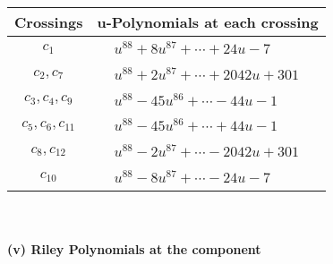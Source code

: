 \documentclass[1p]{elsarticle_modified}
\theoremstyle{definition}
\begin{document}
\begin{tabular}{m{50pt}|m{274pt}}
Crossings & \hspace{64pt}u-Polynomials at each crossing \\
\hline $$\begin{aligned}c_{1}\end{aligned}$$&$\begin{aligned}
&u^{88}+8 u^{87}+\cdots+24 u-7
\end{aligned}$\\
\hline $$\begin{aligned}c_{2},c_{7}\end{aligned}$$&$\begin{aligned}
&u^{88}+2 u^{87}+\cdots+2042 u+301
\end{aligned}$\\
\hline $$\begin{aligned}c_{3},c_{4},c_{9}\end{aligned}$$&$\begin{aligned}
&u^{88}-45 u^{86}+\cdots-44 u-1
\end{aligned}$\\
\hline $$\begin{aligned}c_{5},c_{6},c_{11}\end{aligned}$$&$\begin{aligned}
&u^{88}-45 u^{86}+\cdots+44 u-1
\end{aligned}$\\
\hline $$\begin{aligned}c_{8},c_{12}\end{aligned}$$&$\begin{aligned}
&u^{88}-2 u^{87}+\cdots-2042 u+301
\end{aligned}$\\
\hline $$\begin{aligned}c_{10}\end{aligned}$$&$\begin{aligned}
&u^{88}-8 u^{87}+\cdots-24 u-7
\end{aligned}$\\
\hline
\end{tabular}\\~\\
\newpage\renewcommand{\arraystretch}{1}
\flushleft \textbf{(v) Riley Polynomials at the component}\newline \\
\end{document}
